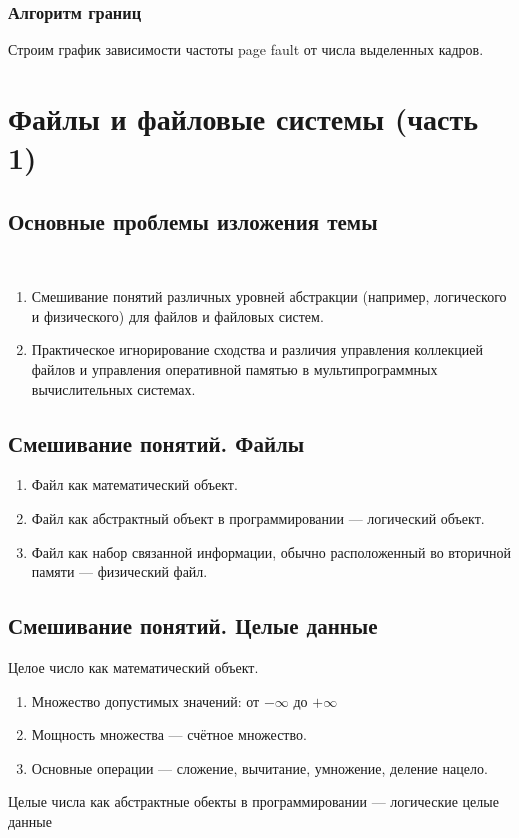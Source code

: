 \documentclass[12pt, a4paper]{article}
\begin{document}
    \subsubsection{Алгоритм границ}
    Строим график зависимости частоты page fault от числа выделенных кадров.
    \section{Файлы и файловые системы (часть 1)}
    \subsection{Основные проблемы изложения темы}\
    \begin{enumerate}
        \item Смешивание понятий различных уровней абстракции (например, логического и физического) для файлов и файловых систем.
        \item Практическое игнорирование сходства и различия управления коллекцией файлов и управления оперативной памятью в мультипрограммных вычислительных системах.
    \end{enumerate}
    \subsection{Смешивание понятий. Файлы}
    \begin{enumerate}
        \item Файл как математический объект.
        \item Файл как абстрактный объект в программировании --- логический объект.
        \item Файл как набор связанной информации, обычно расположенный во вторичной памяти --- физический файл.
    \end{enumerate}
    \subsection{Смешивание понятий. Целые данные}
    \begin{center}
        Целое число как математический объект.
    \end{center}
    \begin{enumerate}
        \item Множество допустимых значений: от $-\infty$ до $+\infty$
        \item Мощность множества --- счётное множество.
        \item Основные операции --- сложение, вычитание, умножение, деление нацело.
    \end{enumerate}
    \begin{center}
        Целые числа как абстрактные обекты в программировании --- логические целые данные 
    \end{center}
\end{document}
